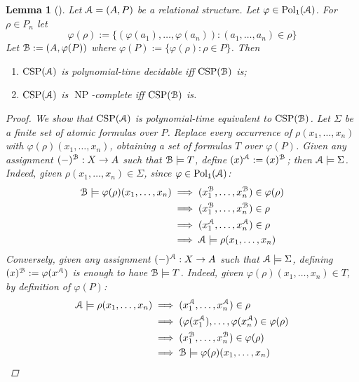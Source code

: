 \documentclass{amsart}
\theoremstyle{plain}
\newtheorem{lemma}[theorem]{Lemma}
\theoremstyle{definition}
\theoremstyle{remark}
\def\phi{\varphi}
\DeclareMathOperator{\CSP}{CSP}
\DeclareMathOperator{\Pol}{Pol}
\DeclareMathOperator{\NP}{NP}
\begin{document}
\begin{lemma}[\cite{jeavons}]
    \label{image}
    Let $\EuScript{A}=(A, P)$ be a relational structure. 
    Let $\phi \in \Pol_1(\EuScript{A})$. 
    For $\rho \in P_n$ let 
    \begin{equation*}
        \phi(\rho):=\{(\phi(a_1), \ldots, \phi(a_n)):(a_1, \ldots, a_n) \in \rho\}
    \end{equation*}
    Let $\EuScript{B}:=(A, \phi(P))$ where $\phi(P):=\{\phi(\rho): \rho \in P\}$.
    Then 
    \begin{enumerate}
        \item $\CSP(\EuScript{A})$ is polynomial-time decidable iff $\CSP(\EuScript{B})$ is; 
        \item $\CSP(\EuScript{A})$ is $\NP$-complete iff $\CSP(\EuScript{B})$ is. 
    \end{enumerate}
    \begin{proof}
        We show that $\CSP(\EuScript{A})$ is polynomial-time equivalent to $\CSP(\EuScript{B})$. 
        Let $\Sigma$ be a finite set of atomic formulas over $P$. 
        Replace every occurrence of $\rho(x_1, \ldots, x_n)$ with $\phi(\rho)(x_1, \ldots, x_n)$, 
        obtaining a set of formulas $T$ over $\phi(P)$. 
        Given any assignment $(-)^{\EuScript{B}}: X \to A$ such that $\EuScript{B} \models T$, 
        define $(x)^{\EuScript{A}}:=(x)^{\EuScript{B}}$; then $\EuScript{A} \models \Sigma$.
        Indeed, given $\rho(x_1, \ldots, x_n) \in \Sigma$, since $\phi \in \Pol_1(\EuScript{A})$: 
        \begin{align*}
            \EuScript{B} \models \phi(\rho)(x_1, \ldots, x_n) & \implies (x_1^{\EuScript{B}}, \ldots, x_n^{\EuScript{B}}) \in \phi(\rho) \\
            & \implies (x_1^{\EuScript{B}}, \ldots, x_n^{\EuScript{B}}) \in \rho \\
            & \implies (x_1^{\EuScript{A}}, \ldots, x_n^{\EuScript{A}}) \in \rho \\
            & \implies \EuScript{A} \models \rho(x_1, \ldots, x_n)
        \end{align*} 
        Conversely, given any assignment $(-)^{\EuScript{A}}: X \to A$ such that $\EuScript{A} \models \Sigma$,
        defining $(x)^{\EuScript{B}}:=\phi(x^{\EuScript{A}})$ is enough to have $\EuScript{B} \models T$.  
        Indeed, given $\phi(\rho)(x_1, \ldots, x_n) \in T$, by definition of $\phi(P)$: 
        \begin{align*}
            \EuScript{A} \models \rho(x_1, \ldots, x_n) & \implies (x_1^{\EuScript{A}}, \ldots, x_n^{\EuScript{A}}) \in \rho \\
            & \implies (\phi(x_1^{\EuScript{A}}), \ldots, \phi(x_n^{\EuScript{A}}) \in \phi(\rho) \\
            & \implies  (x_1^{\EuScript{B}}, \ldots, x_n^{\EuScript{B}}) \in \phi(\rho) \\
            & \implies \EuScript{B} \models \phi(\rho)(x_1, \ldots, x_n) \qedhere
        \end{align*} 
    \end{proof}
\end{lemma}
\end{document}
